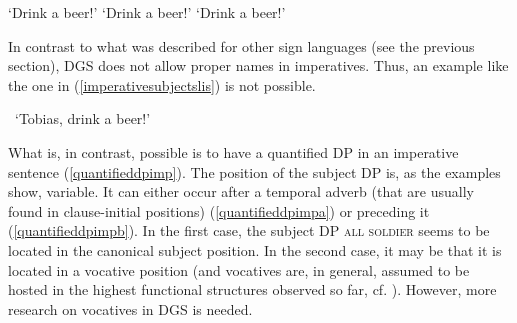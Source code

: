 \begin{exe}
\ex\label{imperativedgssimple}\begin{xlist} 
\ex {}
%
\glt `Drink a beer!' \label{imperativedgssimplea}
\ex {}
%
\glt `Drink a beer!' \label{imperativedgssimpleb}
\ex {}
%
\glt `Drink a beer!' \label{imperativedgssimpled}
\end{xlist}
\end{exe}

\noindent In contrast to what was described for other sign languages (see the previous section), DGS does not allow proper names in imperatives. Thus, an example like the one in (\ref{imperativesubjectslis}) is not possible.


\begin{exe}
\ex *
\glt \textcolor{white}{*}`Tobias, drink a beer!' \label{imperativesubjectslis}
\end{exe}

\noindent What is, in contrast, possible is to have a quantified DP in an imperative sentence (\ref{quantifieddpimp}). The position of the subject DP is, as the examples show, variable. It can either occur after a temporal adverb (that are usually found in clause-initial positions) (\ref{quantifieddpimpa}) or preceding it (\ref{quantifieddpimpb}). In the first case, the subject DP \textsc{all soldier} seems to be located in the canonical subject position. In the second case, it may be that it is located in a vocative position (and vocatives are, in general, assumed to be hosted in the highest functional structures observed so far, cf. \citealt{moro2003notes, hill2007vocatives, hill2013vocatives}). However, more research on vocatives in DGS is needed. 

